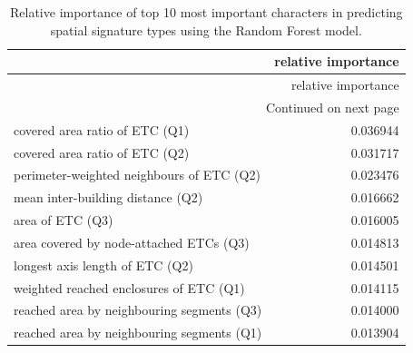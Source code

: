 \documentclass[fleqn,10pt]{wlscirep}
\begin{document}
\begin{longtable}{lr}
    \caption{\label{tab:imp}Relative importance of top 10 most important characters in
predicting spatial signature types using the Random Forest model.}\\
    \toprule
    {} &  relative importance \\
    \midrule
    \endfirsthead

    \toprule
    {} &  relative importance \\
    \midrule
    \endhead
    \midrule
    \multicolumn{2}{r}{{Continued on next page}} \\
    \midrule
    \endfoot

    \bottomrule
    \endlastfoot
    covered area ratio of ETC (Q1)             &             0.036944 \\
    covered area ratio of ETC (Q2)             &             0.031717 \\
    perimeter-weighted neighbours of ETC (Q2)  &             0.023476 \\
    mean inter-building distance (Q2)          &             0.016662 \\
    area of ETC (Q3)                           &             0.016005 \\
    area covered by node-attached ETCs (Q3)    &             0.014813 \\
    longest axis length of ETC (Q2)            &             0.014501 \\
    weighted reached enclosures of ETC (Q1)    &             0.014115 \\
    reached area by neighbouring segments (Q3) &             0.014000 \\
    reached area by neighbouring segments (Q1) &             0.013904 \\
\end{longtable}
\end{document}
